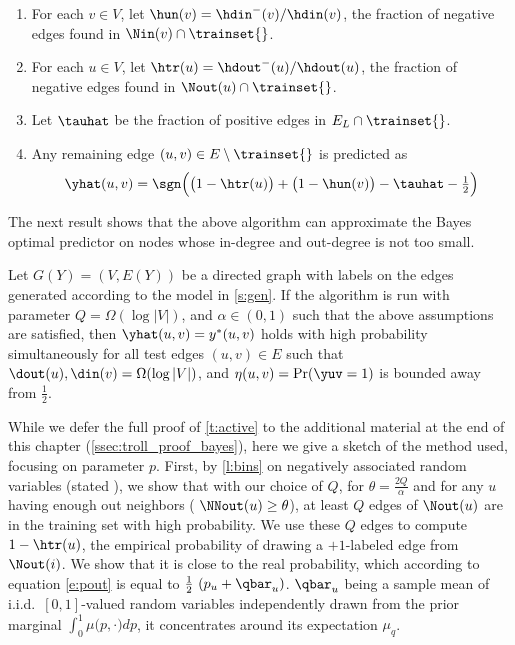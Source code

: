 \begin{enumerate}[label=\textbf{\arabic*.}]
	\item For each $v \in V$, let $\hun(v) = \hdin^-(v)/\hdin(v)$, \ie{} the fraction of
	  negative edges found in $\Nin(v) \cap \trainset{}$.

	\item For each $u \in V$, let $\htr(u) = \hdout^-(u)/\hdout(u)$, \ie{} the fraction of
	  negative edges found in $\Nout(u) \cap \trainset{}$.

	\item Let $\tauhat$ be the fraction of positive edges in $E_L\cap \trainset{}$.

	\item Any remaining edge $(u,v) \in E\setminus \trainset{}$ is predicted as
		$$
		\yhat(u,v) = \sgn\Big(\big(1-\htr(u)\big) + \big(1-\hun(v)\big) -\tauhat - \tfrac{1}{2}\Big)
		$$
\end{enumerate}

The next result shows that the above algorithm can approximate the Bayes optimal predictor on nodes
whose in-degree and out-degree is not too small.

\begin{theorem}
  \label{t:active}
  Let $G(Y) = (V,E(Y))$ be a directed graph with labels on the edges generated according to the
  model in \autoref{s:gen}.
  If the algorithm is run with parameter $Q = \Omega(\log|V|)$, and $\alpha \in (0,1)$ such that the
  above assumptions are satisfied, then $\yhat(u,v) = y^*(u,v)$ holds with high probability
  simultaneously for all test edges $(u,v) \in E$ such that $\dout(u),\din(v) = \Omega(\log|V|)$, and
  $\eta(u,v) = \Pr(\yuv=1)$ is bounded away from $\tfrac{1}{2}$.
\end{theorem}

While we defer the full proof of \autoref{t:active} to the additional material at the end of this
chapter (\autoref{ssec:troll_proof_bayes}), here we give a sketch of the method used, focusing on
parameter $p$. First, by \autoref{l:bins} on negatively associated random variables (stated
), we show that with our choice of $Q$, for $\theta=\frac{2Q}{\alpha}$ and for any
$u$ having enough out neighbors (\ie{} $\NNout(u) \ge \theta$), at least $Q$ edges of $\Nout(u)$
are in the training set with high probability.
We use these $Q$ edges to compute $1-\htr(u)$, the empirical probability of drawing a $+1$-labeled
edge from $\Nout(i)$. We show that it is close to the real probability, which according to equation
\eqref{e:pout} is equal to $\frac{1}{2}\,\left(p_u + \qbar_u\right)$. $\qbar_u$ being a sample mean
of i.i.d.~$[0,1]$-valued random variables independently drawn from the prior marginal $\int_0^1
\mu\big(p,\cdot\big) dp$, it concentrates around its expectation $\mu_q$.

